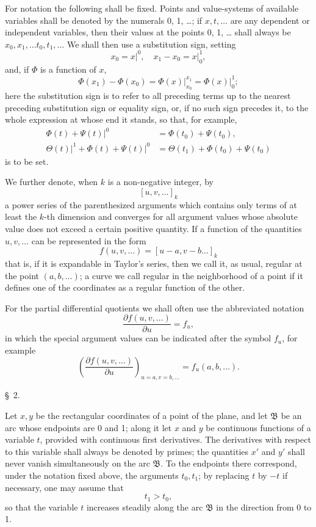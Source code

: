 \documentclass[11pt,a4paper,leqno]{article}
\begin{document}
For notation the following shall be fixed. Points and value-systems of available variables shall be denoted by the numerals 0, 1, \ldots{}; if $x,t,\ldots$ are any dependent or independent variables, then their values at the points 0, 1, \ldots{} shall always be $x_0,x_1,\ldots t_0,t_1,\ldots$ We shall then use a substitution sign, setting
\[
 x_0=\left.x\right|^{0},\quad x_1-x_0=\left.x\right|_{0}^{1},
\]
and, if $\Phi$ is a function of $x$,
\[
 \Phi(x_1)-\Phi(x_0)=\left.\Phi(x)\right|_{x_0}^{x_1}=\left.\Phi(x)\right|_{0}^{1};
\]
here the substitution sign is to refer to all preceding terms up to the nearest preceding substitution sign or equality sign, or, if no such sign precedes it, to the whole expression at whose end it stands, so that, for example,
\[
\begin{aligned}
 \left.\Phi(t)+\Psi(t)\right|^0&=\Phi(t_0)+\Psi(t_0),\\
 \left.\Theta(t)\right|^1+\left.\Phi(t)+\Psi(t)\right|^0&=\Theta(t_1)+\Phi(t_0)+\Psi(t_0)
\end{aligned}
\]
is to be set.

We further denote, when $k$ is a non-negative integer, by
\[
 [u,v,\ldots]_k
\]
a power series of the parenthesized arguments which contains only terms of at least the $k$-th dimension and converges for all argument values whose absolute value does not exceed a certain positive quantity. If a function of the quantities $u,v,\ldots$ can be represented in the form
\[
 f(u,v,\ldots)=[u-a,v-b\ldots]_k
\]
that is, if it is expandable in Taylor's series, then we call it, as usual, regular at the point $(a,b,\ldots)$; a curve we call regular in the neighborhood of a point if it defines one of the coordinates as a regular function of the other.

For the partial differential quotients we shall often use the abbreviated notation
\[
 \frac{\partial f(u,v,\ldots)}{\partial u}=f_u,
\]
in which the special argument values can be indicated after the symbol $f_u$, for example
\[
 \left(\frac{\partial f(u,v,\ldots)}{\partial u}\right)_{u=a,v=b,\ldots}=f_u(a,b,\ldots).
\]

\begin{center}{\large \S~2.}\end{center}

Let $x,y$ be the rectangular coordinates of a point of the plane, and let $\mathfrak{B}$ be an arc whose endpoints are 0 and 1; along it let $x$ and $y$ be continuous functions of a variable $t$, provided with continuous first derivatives. The derivatives with respect to this variable shall always be denoted by primes; the quantities $x'$ and $y'$ shall never vanish simultaneously on the arc $\mathfrak{B}$. To the endpoints there correspond, under the notation fixed above, the arguments $t_0,t_1$; by replacing $t$ by $-t$ if necessary, one may assume that
\[
 t_1>t_0,
\]
so that the variable $t$ increases steadily along the arc $\mathfrak{B}$ in the direction from 0 to 1.
\end{document}
